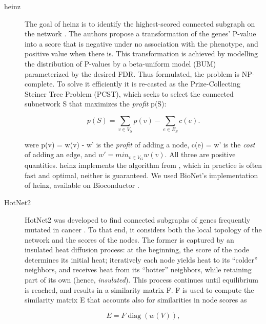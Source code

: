 \documentclass[twocolumn, 10pt]{article}
\begin{document}
\begin{description}
\item[{heinz}] The goal of heinz is to identify the highest-scored connected subgraph on the network \cite{dittrich_identifying_2008}. The authors propose a transformation of the genes' P-value into a score that is negative under no association with the phenotype, and positive value when there is. This transformation is achieved by modelling the distribution of P-values by a beta-uniform model (BUM) parameterized by the desired FDR. Thus formulated, the problem is NP-complete. To solve it efficiently it is re-casted as the Prize-Collecting Steiner Tree Problem (PCST), which seeks to select the connected subnetwork S that maximizes the \emph{profit} p(S):

\begin{equation*}
p(S) = \sum_{v \in V_S} p(v) - \sum_{e \in E_S} c(e). 
\end{equation*}

were p(v) = w(v) - w' is the \emph{profit} of adding a node, c(e) = w' is the \emph{cost} of adding an edge, and $w' = min_{v \in V_{G}} w(v)$. All three are positive quantities. heinz implements the algorithm from \cite{ljubic_algorithmic_2006}, which in practice is often fast and optimal, neither is guaranteed. We used BioNet's implementation of heinz, available on Bioconductor \cite{beisser_bionet:_2010,heinz}.

\item[{HotNet2}] HotNet2 was developed to find connected subgraphs of genes frequently mutated in cancer \cite{leiserson_pan-cancer_2015}. To that end, it considers both the local topology of the network and the scores of the nodes. The former is captured by an insulated heat diffusion process: at the beginning, the score of the node determines its initial heat; iteratively each node yields heat to its ``colder'' neighbors, and receives heat from its ``hotter'' neighbors, while retaining part of its own (hence, \emph{insulated}). This process continues until equilibrium is reached, and results in a similarity matrix F. F is used to compute the similarity matrix E that accounts also for similarities in node scores as 

\begin{equation*} 
E = F \operatorname{diag}(w(V)), 
\end{equation*}


\end{description}
\end{document}
